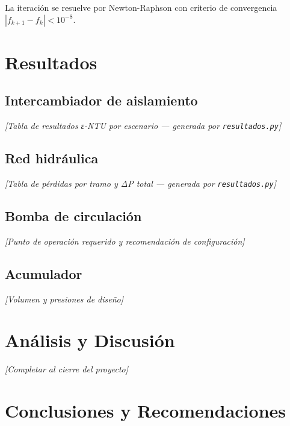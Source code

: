 \documentclass[12pt, letterpaper]{article}
\begin{document}
La iteración se resuelve por Newton-Raphson con criterio de convergencia
$|f_{k+1} - f_k| < 10^{-8}$.

\section{Resultados}

\subsection{Intercambiador de aislamiento}

\textit{[Tabla de resultados ε-NTU por escenario --- generada por \texttt{resultados.py}]}

\subsection{Red hidráulica}

\textit{[Tabla de pérdidas por tramo y ΔP total --- generada por \texttt{resultados.py}]}

\subsection{Bomba de circulación}

\textit{[Punto de operación requerido y recomendación de configuración]}

\subsection{Acumulador}

\textit{[Volumen y presiones de diseño]}

\section{Análisis y Discusión}

\textit{[Completar al cierre del proyecto]}

\section{Conclusiones y Recomendaciones}
\end{document}
